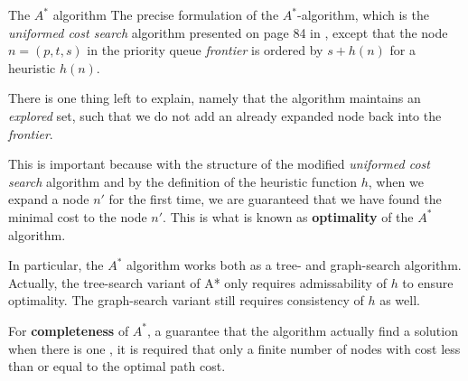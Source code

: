 \begin{subsection}{The $A^*$ algorithm}
  The precise formulation of the $A^*$-algorithm, which is the \textit{uniformed cost search} algorithm presented on page 84 in \cite{rn}, except that the node $n = (p, t, s)$ in the priority queue \textit{frontier} is ordered by $s + h(n)$ for a heuristic $h(n)$.

  There is one thing left to explain, namely that the algorithm maintains an \textit{explored} set, such that we do not add an already expanded node back into the \textit{frontier}.

  This is important because with the structure of the modified \textit{uniformed cost search} algorithm and by the definition of the heuristic function $h$, when we expand a node $n'$ for the first time, we are guaranteed that we have found the minimal cost to the node $n'$. This is what is known as \textbf{optimality} of the $A^*$ algorithm.

  In particular, the $A^*$ algorithm works both as a tree- and graph-search algorithm. Actually, the tree-search variant of A* only requires admissability of $h$ to ensure optimality. The graph-search variant still requires consistency of $h$ as well.

  For \textbf{completeness} of $A^*$, a guarantee that the algorithm actually find a solution when there is one \cite{rn}, it is required that only a finite number of nodes with cost less than or equal to the optimal path cost.

  
\end{subsection}

